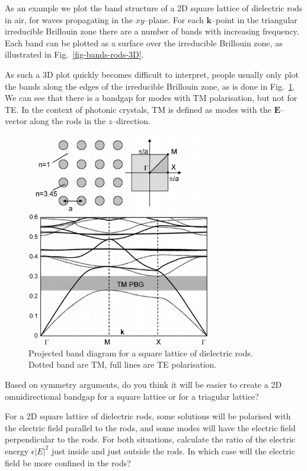 As an example we plot the band structure of a 2D square lattice of dielectric rods in air, for waves propagating in the $xy$--plane. For each ${\mathbf k}$--point in the triangular irreducible Brillouin zone there are a number of bands with increasing frequency. Each band can be plotted as a surface over the irreducible Brillouin zone, as illustrated in Fig.~\ref{fig-bands-rods-3D}.

As such a 3D plot quickly becomes difficult to interpret, people usually only plot the bands along the edges of the irreducible Brillouin zone, as is done in Fig.~\ref{fig-bands-rods}. We can see that there is a bandgap for modes with TM polarisation, but not for TE. In the context of photonic crystals, TM is defined as modes with the ${\mathbf E}$--vector along the rods in the $z$--direction.

\begin{figure}
\centering
\includegraphics[width=8cm]{symmetry/figures/square_bands}
\caption{Projected band diagram for a square lattice of dielectric rods. Dotted band are TM, full lines are TE polarisation.}
\label{fig-bands-rods}
\end{figure}

\begin{exer}
Based on symmetry arguments, do you think it will be easier to create a 2D omnidirectional bandgap for a square lattice or for a triagular lattice?
\end{exer}

\begin{exer}
For a 2D square lattice of dielectric rods, some solutions will be polarised with the electric field parallel to the rods, and some modes will have the electric field perpendicular to the rods. For both situations, calculate the ratio of the electric energy $\epsilon |E|^2$ just inside and just outside the rods. In which case will the electric field be more confined in the rods?
\end{exer}

